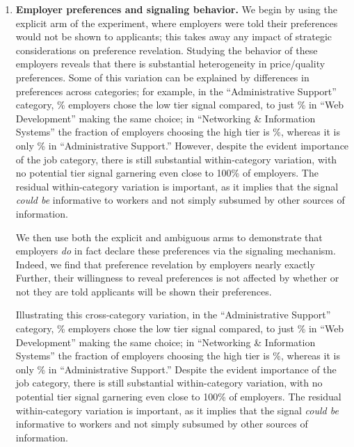 \begin{enumerate}
\item {\bf Employer preferences and signaling behavior.}  We begin by using the explicit arm of the experiment, where employers were told their preferences would not be shown to applicants; this takes away any impact of strategic considerations on preference revelation.
Studying the behavior of these employers reveals that there is substantial heterogeneity in price/quality preferences.
Some of this variation can be explained by differences in preferences across categories; for example, in the ``Administrative Support'' category, \fracLowAdminSpt{}\% employers chose the low tier signal compared, to just \fracLowWeb{}\% in ``Web Development'' making the same choice; in ``Networking \& Information Systems'' the fraction of employers choosing the high tier is \fracHighNetworking{}\%, whereas it is only \fracHighAdminSpt{}\% in ``Administrative Support.''
However, despite the evident importance of the job category, there is still substantial within-category variation, with no potential tier signal garnering even close to 100\% of employers.
The residual within-category variation is important, as it implies that the signal \emph{could be} informative to workers and not simply subsumed by other sources of information.

We then use both the explicit and ambiguous arms to demonstrate that employers {\em do} in fact declare these preferences via the signaling mechanism.  
Indeed, we find that preference revelation by employers nearly exactly 
Further, their willingness to reveal preferences is not affected by whether or not they are told applicants will be shown their preferences.

Illustrating this cross-category variation, in the ``Administrative Support'' category, \fracLowAdminSpt{}\% employers chose the low tier signal compared, to just \fracLowWeb{}\% in ``Web Development'' making the same choice; in ``Networking \& Information Systems'' the fraction of employers choosing the high tier is \fracHighNetworking{}\%, whereas it is only \fracHighAdminSpt{}\% in ``Administrative Support.''
Despite the evident importance of the job category, there is still substantial within-category variation, with no potential tier signal garnering even close to 100\% of employers.
The residual within-category variation is important, as it implies that the signal \emph{could be} informative to workers and not simply subsumed by other sources of information.


\end{enumerate}
